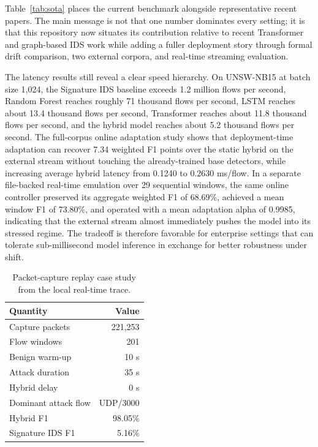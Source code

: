 \documentclass[conference]{IEEEtran}
\begin{document}
Table~\ref{tab:sota} places the current benchmark alongside representative recent papers. The main message is not that one number dominates every setting; it is that this repository now situates its contribution relative to recent Transformer and graph-based IDS work while adding a fuller deployment story through formal drift comparison, two external corpora, and real-time streaming evaluation.

The latency results still reveal a clear speed hierarchy. On UNSW-NB15 at batch size 1{,}024, the Signature IDS baseline exceeds 1.2 million flows per second, Random Forest reaches roughly 71 thousand flows per second, LSTM reaches about 13.4 thousand flows per second, Transformer reaches about 11.8 thousand flows per second, and the hybrid model reaches about 5.2 thousand flows per second. The full-corpus online adaptation study shows that deployment-time adaptation can recover 7.34 weighted F1 points over the static hybrid on the external stream without touching the already-trained base detectors, while increasing average hybrid latency from 0.1240 to 0.2630 ms/flow. In a separate file-backed real-time emulation over 29 sequential windows, the same online controller preserved its aggregate weighted F1 of 68.69\%, achieved a mean window F1 of 73.80\%, and operated with a mean adaptation alpha of 0.9985, indicating that the external stream almost immediately pushes the model into its stressed regime. The tradeoff is therefore favorable for enterprise settings that can tolerate sub-millisecond model inference in exchange for better robustness under shift.

\begin{table}[t]
\caption{Packet-capture replay case study from the local real-time trace.}
\label{tab:case}
\centering
\small
\begin{tabular}{@{}lr@{}}
\toprule
Quantity & Value \\
\midrule
Capture packets & 221{,}253 \\
Flow windows & 201 \\
Benign warm-up & 10 s \\
Attack duration & 35 s \\
Hybrid delay & 0 s \\
Dominant attack flow & UDP/3000 \\
Hybrid F1 & 98.05\% \\
Signature IDS F1 & 5.16\% \\
\bottomrule
\end{tabular}
\end{table}
\end{document}
